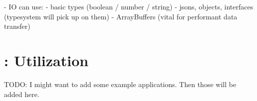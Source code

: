- IO can use:
  - basic types (boolean / number / string)
  - jsons, objects, interfaces (typesystem will pick up on them)
  - ArrayBuffers (vital for performant data transfer)




\section{\mySubRQFourTitle: Utilization}
\label{sec:implementation:utilization}

\begin{note}
  TODO: I might want to add some example applications. 
  Then those will be added here. 
\end{note}